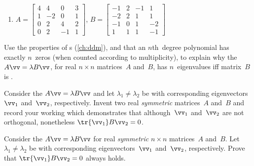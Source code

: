 \begin{exercise}
\begin{enumerate}
\item \(A=\begin{bmatrix} 4 & 4 & 0 & 3
\\ 1 & -2 & 0 & 1
\\ 0 & 2 & 4 & 2
\\ 0 & 2 & -1 & 1 \end{bmatrix}\),
\(B=\begin{bmatrix} -1 & 2 & -1 & 1
\\ -2 & 2 & 1 & 1
\\ -1 & 0 & 1 & -2
\\ 1 & 1 & 1 & -1 \end{bmatrix}\)
  
\end{enumerate}
\end{exercise}


\begin{exercise} \label{ex:} 
Use the properties of s (\autoref{ch:ddm}), and that an \(n\)th~degree polynomial has exactly \(n\)~zeros (when counted according to multiplicity), to explain why the  \(A\vv=\lambda B\vv\), for real \(n\times n\) matrices~\(A\) and~\(B\), has \(n\)~eigenvalues iff matrix~\(B\) is .
\end{exercise}


\begin{exercise} \label{ex:} 
Consider the  \(A\vv=\lambda B\vv\) and let \(\lambda_1\neq\lambda_2\) be  with corresponding eigenvectors~\(\vv_1\) and~\(\vv_2\), respectively.
Invent two real \emph{symmetric} matrices~\(A\) and~\(B\) and record your working which demonstrates that although~\(\vv_1\) and~\(\vv_2\) are not orthogonal, nonetheless \(\tr{\vv_1}B\vv_2=0\).
\end{exercise}


\begin{exercise} \label{ex:eennmov} 
Consider the  \(A\vv=\lambda B\vv\) for real \emph{symmetric} \(n\times n\) matrices~\(A\) and~\(B\). 
Let \(\lambda_1\neq\lambda_2\) be  with corresponding eigenvectors~\(\vv_1\) and~\(\vv_2\), respectively.
Prove that \(\tr{\vv_1}B\vv_2=0\) always holds.
\end{exercise}


